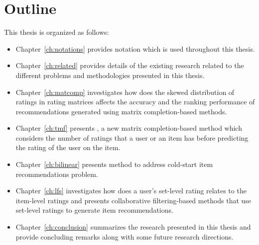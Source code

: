 
\section{Outline}
\label{ch:intro:outline}
This thesis is organized as follows:

\begin{itemize}

\item Chapter~\ref{ch:notations} provides notation which is used
throughout this thesis.

\item Chapter~\ref{ch:related} provides details of the existing research related to the different problems and methodologies presented in this thesis.

\item Chapter~\ref{ch:matcomp} investigates how does the skewed distribution of ratings in rating matrices affects the accuracy and the ranking performance of recommendations generated using matrix completion-based methods.


\item Chapter~\ref{ch:tmf} presents \TMF,  a new matrix completion-based method which considers the number of ratings that a user or an item has before predicting the rating of the user on the item.


\item Chapter~\ref{ch:bilinear} presents \CFEXPB method to address \TOPN cold-start item recommendations problem.


\item Chapter~\ref{ch:lfs} investigates how does a user's set-level rating relates to the item-level ratings and presents collaborative filtering-based methods that use set-level ratings to generate item recommendations.



\item Chapter~\ref{ch:conclusion} summarizes the research presented in this thesis and provide concluding remarks along with some future research directions.

\end{itemize}








